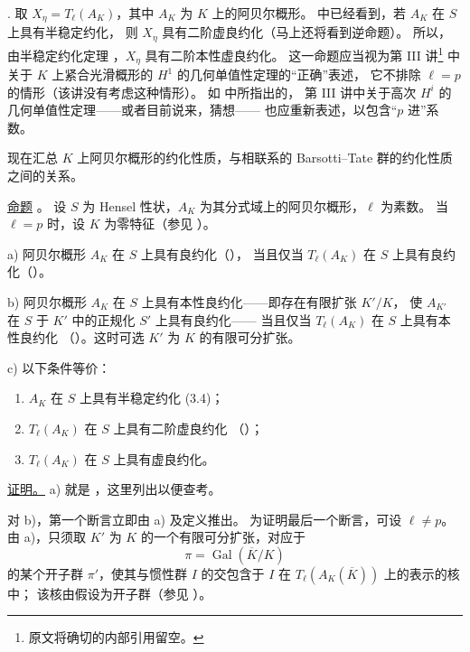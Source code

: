\medskip
\noindent
{}. 取 $X_\eta=T_\ell(A_K)$，其中 $A_K$ 为 $K$ 上的阿贝尔概形。
 中已经看到，若 $A_K$ 在 $S$ 上具有半稳定约化，
则 $X_\eta$ 具有二阶虚良约化（马上还将看到逆命题）。
所以，由半稳定约化定理 ，$X_\eta$ 具有二阶本性虚良约化。
这一命题应当视为第 III 讲\footnote{原文将确切的内部引用留空。}
中关于 $K$ 上紧合光滑概形的 $H^1$ 的几何单值性定理的“正确”表述，
它不排除 $\ell=p$ 的情形（该讲没有考虑这种情形）。
如  中所指出的，
第 III 讲中关于高次 $H^i$ 的几何单值性定理——或者目前说来，猜想——
也应重新表述，以包含“$p$ 进”系数。

现在汇总 $K$ 上阿贝尔概形的约化性质，与相联系的 Barsotti--Tate 群的约化性质之间的关系。

\medskip
\noindent
\underline{命题} 。
设 $S$ 为 Hensel 性状，$A_K$ 为其分式域上的阿贝尔概形，$\ell$ 为素数。
当 $\ell=p$ 时，设 $K$ 为零特征（参见 ）。

\smallskip
\noindent
a) 阿贝尔概形 $A_K$ 在 $S$ 上具有良约化（），
当且仅当 $T_\ell(A_K)$ 在 $S$ 上具有良约化（）。

\smallskip
\noindent
b) 阿贝尔概形 $A_K$ 在 $S$ 上具有本性良约化——即存在有限扩张 $K'/K$，
使 $A_{K'}$ 在 $S$ 于 $K'$ 中的正规化 $S'$ 上具有良约化——
当且仅当 $T_\ell(A_K)$ 在 $S$ 上具有本性良约化
（）。这时可选 $K'$ 为 $K$ 的有限可分扩张。

\smallskip
\noindent
c) 以下条件等价：
\begin{enumerate}
\item[1)] $A_K$ 在 $S$ 上具有半稳定约化 (3.4)；
\item[2)] $T_\ell(A_K)$ 在 $S$ 上具有二阶虚良约化
  （）；
\item[3)] $T_\ell(A_K)$ 在 $S$ 上具有虚良约化。
\end{enumerate}

\noindent
\underline{证明。} a) 就是 ，这里列出以便查考。

对 b)，第一个断言立即由 a) 及定义推出。
为证明最后一个断言，可设 $\ell\neq p$。
由 a)，只须取 $K'$ 为 $K$ 的一个有限可分扩张，对应于
\[
 \pi=\operatorname{Gal}(\overline K/K)
\]
的某个开子群 $\pi'$，使其与惯性群 $I$ 的交包含于 $I$ 在 $T_\ell(A_K(\overline K))$ 上的表示的核中；
该核由假设为开子群（参见 ）。

